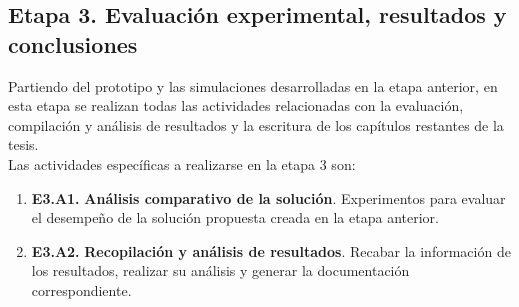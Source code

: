 \documentclass[sigconf]{acmart}
\begin{document}
  \subsection*{Etapa 3. Evaluaci\'{o}n experimental, resultados y conclusiones}
  
  Partiendo del prototipo y las simulaciones desarrolladas en la etapa anterior, en esta etapa se realizan todas las actividades relacionadas con la evaluación, compilación y análisis de resultados y la escritura de los capítulos restantes de la tesis. \\

  Las actividades espec\'{i}ficas a realizarse en la etapa 3 son:
  
  \begin{enumerate}
  \item[] \textbf{E3.A1.} \textbf{Análisis comparativo de la soluci\'{o}n}. Experimentos para evaluar el desempe\~{n}o de la solución propuesta creada en la etapa anterior.  
  \item[] \textbf{E3.A2.} \textbf{Recopilaci\'{o}n y análisis de resultados}. Recabar la información de los resultados, realizar su análisis y generar la documentación correspondiente.
  
  \end{enumerate}






\end{document}
